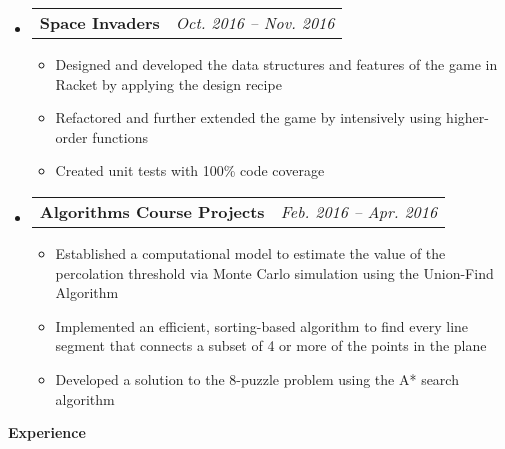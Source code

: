 \documentclass[letterpaper,11pt]{article}
\makeatletter
\newcommand{\resitem}[1]{\item #1 \vspace{-2pt}}
\newcommand{\resheading}[1]{{\large \colorbox{mygrey}{\begin{minipage}{\textwidth}{\textbf{#1 \vphantom{p\^{E}}}}\end{minipage}}}}
\newcommand{\ressubheadingproj}[4]{
\begin{tabular*}{6.5in}{l@{\extracolsep{\fill}}r}
    \textbf{#1} & \textit{#2} \\
\end{tabular*}\vspace{-6pt}}
\makeatother
\begin{document}
    \begin{itemize}
        \item\ressubheadingproj
        {Space Invaders}
        {Oct. 2016 -- Nov. 2016}
        {}{}
        {\footnotesize
        \begin{itemize}
            \resitem{Designed and developed the data structures and features of the game in
            Racket by applying the design recipe}
            \resitem{Refactored and further extended the game by intensively using higher-order
            functions}
            \resitem{Created unit tests with 100\% code coverage}

        \end{itemize}
        }
    \end{itemize}

    \begin{itemize}
        \item\ressubheadingproj
        {Algorithms Course Projects}{Feb. 2016 -- Apr. 2016}
        {}{}
        {\footnotesize
        \begin{itemize}
            \resitem{Established a computational model to estimate the value of the percolation
            threshold via Monte Carlo simulation using the Union-Find Algorithm}
            \resitem{Implemented an efficient, sorting-based algorithm to find every line segment
            that connects a subset of 4 or more of the points in the plane}
            \resitem{Developed a solution to the 8-puzzle problem using the A* search algorithm}
        \end{itemize}
        }
    \end{itemize}


    \resheading{Experience}
\end{document}
